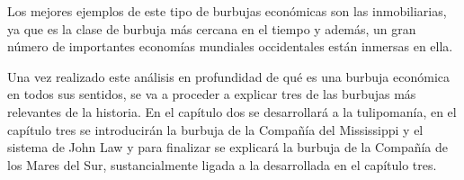 Los mejores ejemplos de este tipo de burbujas económicas son las inmobiliarias, ya que es la clase de burbuja más cercana en el tiempo y además, un gran número de importantes economías mundiales occidentales están inmersas en ella. 

Una vez realizado este análisis en profundidad de qué es una burbuja económica en todos sus sentidos, se va a proceder a explicar tres de las burbujas más relevantes de la historia. En el capítulo dos se desarrollará a la tulipomanía, en el capítulo tres se introducirán la burbuja de la Compañía del Mississippi y el sistema de John Law y para finalizar se explicará la burbuja de la Compañía de los Mares del Sur, sustancialmente ligada a la desarrollada en el capítulo tres. 

